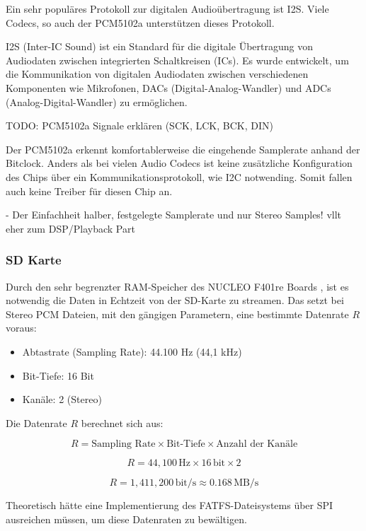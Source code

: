 Ein sehr populäres Protokoll zur digitalen Audioübertragung ist I2S. Viele Codecs, so auch der PCM5102a unterstützen dieses Protokoll.

I2S (Inter-IC Sound) ist ein Standard für die digitale Übertragung von Audiodaten zwischen integrierten Schaltkreisen (ICs). Es wurde entwickelt, um die Kommunikation von digitalen Audiodaten zwischen verschiedenen Komponenten wie Mikrofonen, DACs (Digital-Analog-Wandler) und ADCs (Analog-Digital-Wandler) zu ermöglichen. 

TODO: PCM5102a Signale erklären (SCK, LCK, BCK, DIN)

Der PCM5102a erkennt komfortablerweise die eingehende Samplerate anhand der Bitclock.
Anders als bei vielen Audio Codecs ist keine zusätzliche Konfiguration des Chips über ein Kommunikationsprotokoll, wie I2C notwending.
Somit fallen auch keine Treiber für diesen Chip an.

- Der Einfachheit halber, festgelegte Samplerate und nur Stereo Samples! vllt eher zum DSP/Playback Part


\subsubsection{SD Karte}

Durch den sehr begrenzter RAM-Speicher des NUCLEO F401re Boards , ist es notwendig die Daten in Echtzeit von der SD-Karte zu streamen. Das setzt bei Stereo PCM Dateien, mit den gängigen Parametern, eine bestimmte Datenrate \( R \) voraus:

\begin{itemize}
	\item Abtastrate (Sampling Rate): 44.100 Hz (44,1 kHz)
	\item Bit-Tiefe: 16 Bit
	\item Kanäle: 2 (Stereo)
\end{itemize}


Die Datenrate \( R \) berechnet sich aus:

\[
R = \text{Sampling Rate} \times \text{Bit-Tiefe} \times \text{Anzahl der Kanäle}
\]



\[
R = 44{,}100 \, \text{Hz} \times 16 \, \text{bit} \times 2
\]

\[
R = 1{,}411{,}200 \, \text{bit/s} \approx 0.168 \, \text{MB/s}
\]


Theoretisch hätte eine Implementierung des FATFS-Dateisystems über SPI ausreichen müssen, um diese Datenraten zu bewältigen. 

